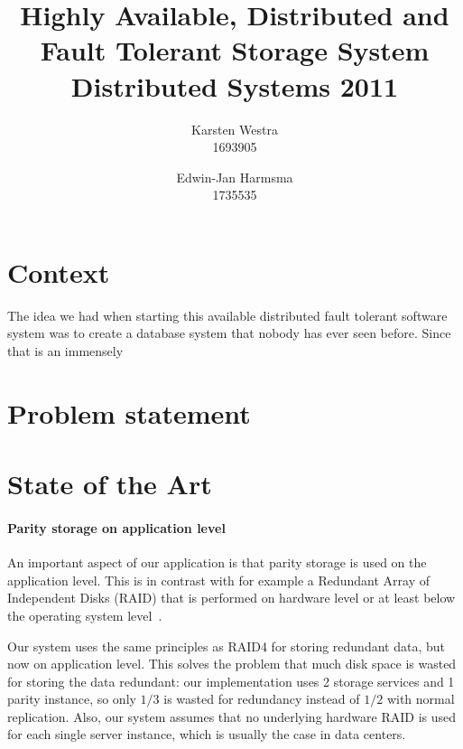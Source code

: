 \documentclass[12pt,a4paper]{scrartcl}
\title{\large{Highly Available, Distributed and Fault Tolerant Storage System} \\ \normalsize{Distributed Systems 2011}}
\author{Karsten Westra\\1693905 \and Edwin-Jan Harmsma\\1735535}
\begin{document}
\maketitle

\tableofcontents
\clearpage



\section{Context}
The idea we had when starting this available distributed fault tolerant software system was to create a database system that nobody has ever seen before. Since that is an immensely

\section{Problem statement}

\section{State of the Art}
\label{sec:state-of-the-art}

\paragraph{Parity storage on application level}
An important aspect of our application is that parity storage is used on the application level. This is in contrast with for example a Redundant Array of Independent Disks (RAID) that is performed on hardware level or at least below the operating system level~\cite{wiki-raid}.

Our system uses the same principles as RAID4 for storing redundant data, but now on application level. This solves the problem that much disk space is wasted for storing the data redundant: our implementation uses 2 storage services and 1 parity instance, so only $1/3$ is wasted for redundancy instead of $1/2$ with normal replication. Also, our system assumes that no underlying hardware RAID is used for each single server instance, which is usually the case in data centers.
\end{document}

